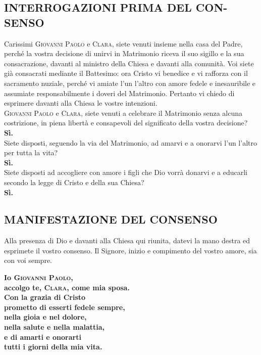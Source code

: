\documentclass[10pt,b6paper,usenames,twoside]{article}
\begin{document}
\subsection*{\textcolor{forestgreen(traditional)}{INTERROGAZIONI PRIMA DEL CON- \linebreak SENSO}} 
\noindent Carissimi \textcolor{forestgreen(traditional)}{\textsc{Giovanni Paolo}} e \textcolor{forestgreen(traditional)}{\textsc{Clara}}, siete venuti insieme nella casa del Padre, perché la vostra decisione di unirvi in Matrimonio riceva il suo sigillo e la sua consacrazione, davanti al ministro della Chiesa e davanti alla comunità. 
\noindent Voi siete già consacrati mediante il Battesimo: ora Cristo vi benedice e vi rafforza con il sacramento nuziale, perché vi amiate l’un l'altro con amore fedele e inesauribile e assumiate responsabilmente i doveri del Matrimonio.
\noindent Pertanto vi chiedo di esprimere davanti alla Chiesa le vostre intenzioni.\\

\noindent \textcolor{forestgreen(traditional)}{\textsc{Giovanni Paolo}} e \textcolor{forestgreen(traditional)}{\textsc{Clara}}, siete venuti a celebrare il Matrimonio senza alcuna costrizione, in piena libertà e consapevoli del significato della vostra decisione?\\ 
\textbf{Sì.}\\ 

\noindent Siete disposti, seguendo la via del Matrimonio, ad amarvi e a onorarvi l'un l'altro per tutta la vita?\\ 
\textbf{Sì.}\\ 

\noindent Siete disposti ad accogliere con amore i figli che Dio vorrà donarvi e a educarli secondo la legge di Cristo e della sua Chiesa?\\ 
\textbf{Sì.} 

\clearpage

\subsection*{\textcolor{forestgreen(traditional)}{MANIFESTAZIONE DEL CONSENSO}} 

\noindent Alla presenza di Dio e davanti alla Chiesa qui riunita, datevi la mano destra ed esprimete il vostro consenso. Il Signore, inizio e compimento del vostro amore, sia con voi sempre.\smallskip 
\\ 

\begin{large} 
\noindent \textbf{Io \textcolor{forestgreen(traditional)}{\textsc{Giovanni Paolo}},\\
accolgo te, \textcolor{forestgreen(traditional)}{\textsc{Clara}}, come mia sposa.\\ 
Con la grazia di Cristo\\ 
prometto di esserti fedele sempre,\\ 
nella gioia e nel dolore,\\ 
nella salute e nella malattia,\\ 
e di amarti e onorarti\\ 
tutti i giorni della mia vita.} 
\end{large}\smallskip 
\\ 
 
\end{document}
